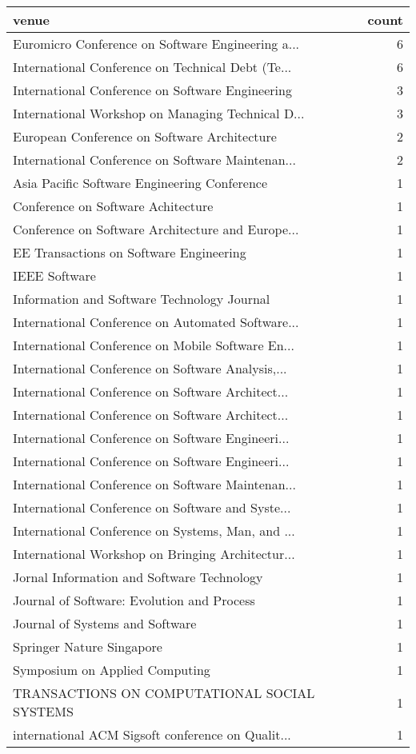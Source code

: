 \begin{tabular}{lr}
\toprule
                                             venue &  count \\
\midrule
 Euromicro Conference on Software Engineering a... &      6 \\
 International Conference on Technical Debt (Te... &      6 \\
  International Conference on Software Engineering &      3 \\
 International Workshop on Managing Technical D... &      3 \\
      European Conference on Software Architecture &      2 \\
 International Conference on Software Maintenan... &      2 \\
      Asia Pacific Software Engineering Conference &      1 \\
                Conference on Software Achitecture &      1 \\
 Conference on Software Architecture and Europe... &      1 \\
           EE Transactions on Software Engineering &      1 \\
                                     IEEE Software &      1 \\
       Information and Software Technology Journal &      1 \\
 International Conference on Automated Software... &      1 \\
 International Conference on Mobile Software En... &      1 \\
 International Conference on Software Analysis,... &      1 \\
 International Conference on Software Architect... &      1 \\
 International Conference on Software Architect... &      1 \\
 International Conference on Software Engineeri... &      1 \\
 International Conference on Software Engineeri... &      1 \\
 International Conference on Software Maintenan... &      1 \\
 International Conference on Software and Syste... &      1 \\
 International Conference on Systems, Man, and ... &      1 \\
 International Workshop on Bringing Architectur... &      1 \\
        Jornal Information and Software Technology &      1 \\
        Journal of Software: Evolution and Process &      1 \\
                   Journal of Systems and Software &      1 \\
                         Springer Nature Singapore &      1 \\
                    Symposium on Applied Computing &      1 \\
      TRANSACTIONS ON COMPUTATIONAL SOCIAL SYSTEMS &      1 \\
 international ACM Sigsoft conference on Qualit... &      1 \\
\bottomrule
\end{tabular}
